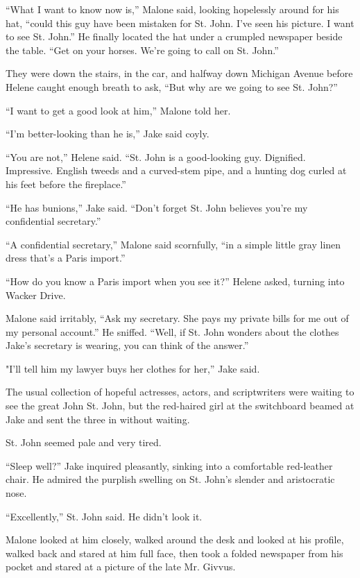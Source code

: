 \documentclass{novel}
\begin{document}
“What I want to know now is,” Malone said, looking hopelessly around for his hat, “could this guy have been mistaken for St. John. I've seen his picture. I want to see St. John.” He finally located the hat under a crumpled newspaper beside the table. “Get on your horses. We’re going to call on St. John.”

They were down the stairs, in the car, and halfway down Michigan Avenue before Helene caught enough breath to ask, “But why are we going to see St. John?”

“I want to get a good look at him,” Malone told her.

“I’m better-looking than he is,” Jake said coyly.

“You are not,” Helene said. “St. John is a good-looking guy. Dignified. Impressive. English tweeds and a curved-stem pipe, and a hunting dog curled at his feet before the fireplace.”

“He has bunions,” Jake said. “Don’t forget St. John believes you’re my confidential secretary.”

“A confidential secretary,” Malone said scornfully, “in a simple little gray linen dress that’s a Paris import.”

“How do you know a Paris import when you see it?” Helene asked, turning into Wacker Drive.

Malone said irritably, “Ask my secretary. She pays my private bills for me out of my personal account.” He sniffed. “Well, if St. John wonders about the clothes Jake’s secretary is wearing, you can think of the answer.”

"I'll tell him my lawyer buys her clothes for her,” Jake said.

The usual collection of hopeful actresses, actors, and scriptwriters were waiting to see the great John St. John, but the red-haired girl at the switchboard beamed at Jake and sent the three in without waiting.

St. John seemed pale and very tired.

“Sleep well?” Jake inquired pleasantly, sinking into a comfortable red-leather chair. He admired the purplish swelling on St. John’s slender and aristocratic nose.

“Excellently,” St. John said. He didn’t look it.

Malone looked at him closely, walked around the desk and looked at his profile, walked back and stared at him full face, then took a folded newspaper from his pocket and stared at a picture of the late Mr. Givvus.
\end{document}
